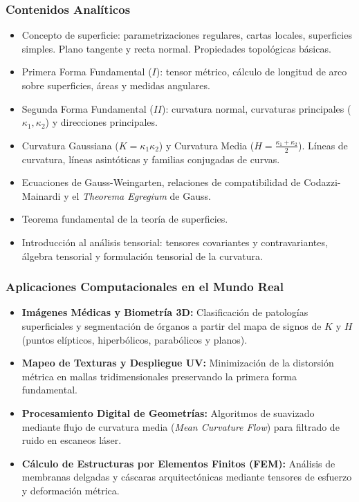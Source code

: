 \documentclass[11pt, a4paper]{article}
\begin{document}
	\subsubsection*{Contenidos Analíticos}
	\begin{itemize}
		\item Concepto de superficie: parametrizaciones regulares, cartas locales, superficies simples. Plano tangente y recta normal. Propiedades topológicas básicas.
		\item Primera Forma Fundamental ($I$): tensor métrico, cálculo de longitud de arco sobre superficies, áreas y medidas angulares.
		\item Segunda Forma Fundamental ($II$): curvatura normal, curvaturas principales ($\kappa_1, \kappa_2$) y direcciones principales.
		\item Curvatura Gaussiana ($K = \kappa_1 \kappa_2$) y Curvatura Media ($H = \frac{\kappa_1 + \kappa_2}{2}$). Líneas de curvatura, líneas asintóticas y familias conjugadas de curvas.
		\item Ecuaciones de Gauss-Weingarten, relaciones de compatibilidad de Codazzi-Mainardi y el \emph{Theorema Egregium} de Gauss.
		\item Teorema fundamental de la teoría de superficies.
		\item Introducción al análisis tensorial: tensores covariantes y contravariantes, álgebra tensorial y formulación tensorial de la curvatura.
	\end{itemize}
	
	\subsubsection*{Aplicaciones Computacionales en el Mundo Real}
	\begin{itemize}
		\item \textbf{Imágenes Médicas y Biometría 3D:} Clasificación de patologías superficiales y segmentación de órganos a partir del mapa de signos de $K$ y $H$ (puntos elípticos, hiperbólicos, parabólicos y planos).
		\item \textbf{Mapeo de Texturas y Despliegue UV:} Minimización de la distorsión métrica en mallas tridimensionales preservando la primera forma fundamental.
		\item \textbf{Procesamiento Digital de Geometrías:} Algoritmos de suavizado mediante flujo de curvatura media (\emph{Mean Curvature Flow}) para filtrado de ruido en escaneos láser.
		\item \textbf{Cálculo de Estructuras por Elementos Finitos (FEM):} Análisis de membranas delgadas y cáscaras arquitectónicas mediante tensores de esfuerzo y deformación métrica.
	\end{itemize}
	
\end{document}
